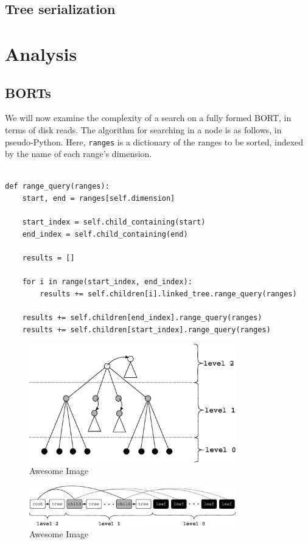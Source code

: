 \documentclass[11pt, oneside]{article}
\begin{document}
\subsection{Tree serialization}

\section{Analysis}

\subsection{BORTs}

We will now examine the complexity of a search on a fully formed BORT, in terms
of disk reads. The algorithm for searching in a node is as follows, in
pseudo-Python. Here, \texttt{ranges} is a dictionary of the ranges to be sorted,
indexed by the name of each range's dimension.

\begin{verbatim}

def range_query(ranges):
    start, end = ranges[self.dimension]
    
    start_index = self.child_containing(start)
    end_index = self.child_containing(end)
    
    results = []

    for i in range(start_index, end_index):
        results += self.children[i].linked_tree.range_query(ranges)

    results += self.children[end_index].range_query(ranges)
    results += self.children[start_index].range_query(ranges)

\end{verbatim}

\begin{figure}[p]
    \centering
    \includegraphics[width=0.8\textwidth]{fig1.eps}
    \caption{Awesome Image}
\end{figure}
\begin{figure}[p]
    \centering
    \includegraphics[width=0.8\textwidth]{fig2.eps}
    \caption{Awesome Image}
\end{figure}
\end{document}

